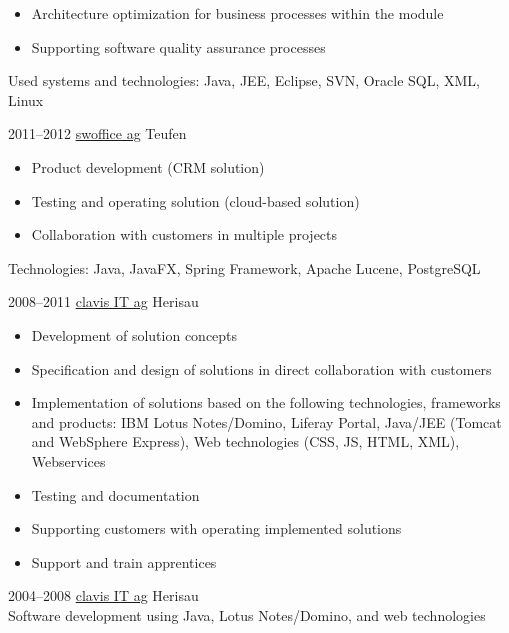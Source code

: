 \documentclass[]{cv-style}
\begin{document}
\begin{entrylist}
{\begin{itemize}
    \item Architecture optimization for business processes within the module
    \item Supporting software quality assurance processes
  \end{itemize}
  Used systems and technologies: Java, JEE, Eclipse, SVN, Oracle SQL, XML, Linux}
\entry
  {2011--2012}
  {\href{https://www.swoffice.ch/}{swoffice ag}}
  {Teufen}
  {
  \begin{itemize}
  	\item Product development (CRM solution)
  	\item Testing and operating solution (cloud-based solution)
  	\item Collaboration with customers in multiple projects
  \end{itemize}
  Technologies: Java, JavaFX, Spring Framework, Apache Lucene, PostgreSQL}
\entry
  {2008--2011}
  {\href{https://www.clavisit.com/}{clavis IT ag}}
  {Herisau}
  {
  \begin{itemize}
  	\item Development of solution concepts
  	\item Specification and design of solutions in direct collaboration with customers
  	\item Implementation of solutions based on the following technologies, frameworks and products: IBM Lotus Notes/Domino, Liferay Portal, Java/JEE (Tomcat and WebSphere Express), Web technologies (CSS, JS, HTML, XML), Webservices
  	\item Testing and documentation
  	\item Supporting customers with operating implemented solutions
  	\item Support and train apprentices
  \end{itemize}}
\entry
  {2004--2008}
  {\href{https://www.clavisit.com/}{clavis IT ag}}
  {Herisau}
  {\\
  Software development using Java, Lotus Notes/Domino, and web technologies}
\end{entrylist}

\end{document}
